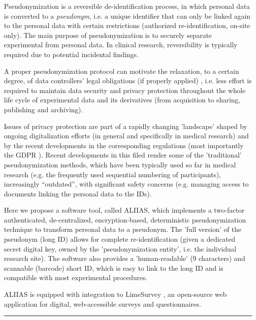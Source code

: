 Pseudonymization is a reversible de-identification process, in which personal data is converted to a \emph{pseudonym}, i.e. a unique identifier that can only be linked again to the personal data with certain restrictions (authorized re-identification, on-site only). The main purpose of pseudonymization is to securely separate experimental from personal data. In clinical research, reversibility is typically required due to potential incidental findings.

A proper pseudonymization protocol can motivate the relaxation, to a certain degree, of data controllers’ legal obligations (if properly applied) \cite{pseudonym}, i.e. less effort is required to maintain data security and privacy protection throughout the whole life cycle of experimental data and its derivatives (from acquisition to sharing, publishing and archiving).

Issues of privacy protection are part of a rapidly changing 'landscape' shaped by ongoing digitalization efforts (in general and specifically in medical research) and by the recent developments in the corresponding regulations (most importantly the GDPR \cite{gdpr}). Recent developments in  this filed render some of the 'traditional' pseudonymization methods, which have been typically used so far in medical research (e.g. the frequently used sequential numbering of participants), increasingly “outdated”, with significant safety concerns (e.g. managing access to documents linking the personal data to the IDs).

Here we propose a software tool, called ALIIAS, which implements a two-factor authenticated, de-centralized, encryption-based, deterministic pseudonymization technique to transform personal data to a pseudonym.
The 'full version' of the pseudonym (long ID) allows for complete re-identification (given a dedicated secret digital key, owned by the 'pseudonymization entity', i.e. the individual research site). The software also provides a 'human-readable' (9 characters) and scannable (barcode) short ID, which is easy to link to the long ID and is compatible with most experimental procedures.

ALIIAS is equipped with integration to LimeSurvey \cite{limesurvey}, an open-source web application for digital, web-accessible surveys and questionnaires.

\par\noindent\rule{\textwidth\color{pniblue}}{0.4pt}

